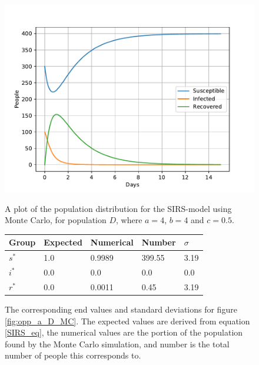 \documentclass[a4paper]{article}
\begin{document}
	\begin{figure}[!htb]
		\centering
		\begin{minipage}{0.49\textwidth}
			\centering
			\includegraphics[scale=0.6]{../plots/opp_a_D_MC.pdf}
			\caption{A plot of the population distribution for the SIRS-model using Monte Carlo, for population $D$, where $a=4$, $b=4$ and $c=0.5$. }\label{fig:opp_a_D_MC}
		\end{minipage}
		\begin{minipage}{0.49\textwidth}
			\centering
			\captionsetup{type=table} %
			\begin{tabular}{|l|l|l|l|l|}
				\hline
				Group & Expected & Numerical   & Number  & $\sigma$\\ \hline
				$s^*$ & 1.0 & 0.9989 & 399.55 & 3.19\\ \hline
				$i^*$ & 0.0 & 0.0 & 0.0 & 0.0\\ \hline
				$r^*$ & 0.0 & 0.0011 & 0.45 & 3.19\\ \hline
			\end{tabular}
			\caption{The corresponding end values and standard deviations for figure \ref{fig:opp_a_D_MC}. The expected values are derived from equation \ref{SIRS_eq}, the numerical values are the portion of the population found by the Monte Carlo simulation, and number is the total number of people this corresponds to.}\label{tab:opp_a_D_mc}
		\end{minipage}
	\end{figure}
	
\end{document}

